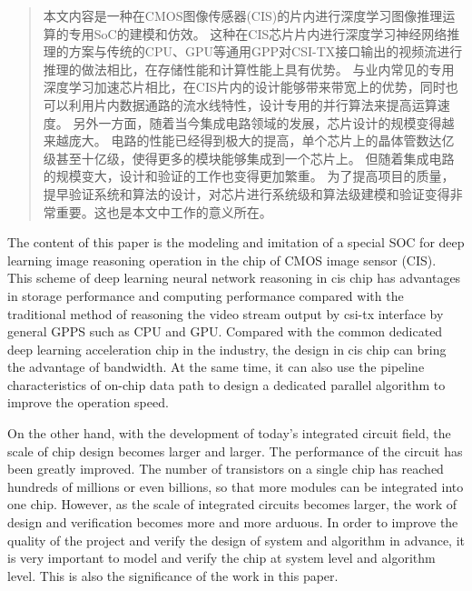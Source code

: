 
\begin{abstract}
  本文内容是一种在CMOS图像传感器(CIS)的片内进行深度学习图像推理运算的专用SoC的建模和仿效。
  这种在CIS芯片片内进行深度学习神经网络推理的方案与传统的CPU、GPU等通用GPP对CSI-TX接口输出的视频流进行推理的做法相比，在存储性能和计算性能上具有优势。
  与业内常见的专用深度学习加速芯片相比，在CIS片内的设计能够带来带宽上的优势，同时也可以利用片内数据通路的流水线特性，设计专用的并行算法来提高运算速度。
  另外一方面，随着当今集成电路领域的发展，芯片设计的规模变得越来越庞大。
  电路的性能已经得到极大的提高，单个芯片上的晶体管数达亿级甚至十亿级，使得更多的模块能够集成到一个芯片上。
  但随着集成电路的规模变大，设计和验证的工作也变得更加繁重。
  为了提高项目的质量，提早验证系统和算法的设计，对芯片进行系统级和算法级建模和验证变得非常重要。这也是本文中工作的意义所在。


\end{abstract}

\begin{abstract*}
  The content of this paper is the modeling and imitation of a special SOC for deep learning image reasoning operation in the chip of CMOS image sensor (CIS).
  This scheme of deep learning neural network reasoning in cis chip has advantages in storage performance and computing performance compared with the traditional method of reasoning the video stream output by csi-tx interface by general GPPS such as CPU and GPU. Compared with the common dedicated deep learning acceleration chip in the industry, the design in cis chip can bring the advantage of bandwidth. At the same time, it can also use the pipeline characteristics of on-chip data path to design a dedicated parallel algorithm to improve the operation speed.  

  On the other hand, with the development of today's integrated circuit field, the scale of chip design becomes larger and larger. The performance of the circuit has been greatly improved. The number of transistors on a single chip has reached hundreds of millions or even billions, so that more modules can be integrated into one chip.
  However, as the scale of integrated circuits becomes larger, the work of design and verification becomes more and more arduous. In order to improve the quality of the project and verify the design of system and algorithm in advance, it is very important to model and verify the chip at system level and algorithm level. This is also the significance of the work in this paper.
\end{abstract*}
